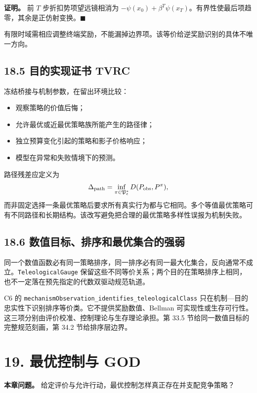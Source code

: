 \documentclass[
  11pt,
  oneside]{book}
\providecommand{\tightlist}{%
  \setlength{\itemsep}{0pt}\setlength{\parskip}{0pt}}
\begin{document}
\textbf{证明。} 前 \(T\) 步折扣势项望远镜相消为 \(-\psi(x_0)+\beta^T\psi(x_T)\)。有界性使最后项趋零，其余是正仿射变换。\(\blacksquare\)

有限时域需相应调整终端奖励，不能漏掉边界项。该等价给逆奖励识别的具体不唯一方向。

\section{18.5 目的实现证书 TVRC}\label{ux76eeux7684ux5b9eux73b0ux8bc1ux4e66-tvrc}

冻结桥接与机制参数，在留出环境比较：

\begin{itemize}
\tightlist
\item
  观察策略的价值后悔；
\item
  允许最优或近最优策略族所能产生的路径律；
\item
  独立预算变化引起的策略和影子价格响应；
\item
  模型在异常和失败情境下的预测。
\end{itemize}

路径残差应定义为 \[\Delta_{\rm path}=
\inf_{\pi\in\mathfrak P^*_\epsilon}
D(P_{\rm obs},P^\pi),\] 而非固定选择一条最优策略后要求所有真实行为都与它相同。多个等值最优策略可有不同路径和长期结构。该改写避免把合理的最优策略多样性误报为机制失败。

\section{18.6 数值目标、排序和最优集合的强弱}\label{ux6570ux503cux76eeux6807ux6392ux5e8fux548cux6700ux4f18ux96c6ux5408ux7684ux5f3aux5f31}

同一个数值函数必有同一策略排序，同一排序必有同一最大化集合，反向通常不成立。\nolinkurl{TeleologicalGauge} 保留这些不同等价关系；两个目的在策略排序上相同，也不一定落在预先指定的代数双驱动规范轨道。

C6 的 \nolinkurl{mechanismObservation_identifies_teleologicalClass} 只在机制---目的忠实性下识别排序等价类。它不提供奖励数值、Bellman 可实现性或生存可行性。这三项分别由评价校准、控制理论与生存理论承担。第 33.5 节给同一数值目标的完整规范刻画，第 34.2 节给排序层边界。

\chapter{19. 最优控制与 GOD}\label{ch-19}

\textbf{本章问题。} 给定评价与允许行动，最优控制怎样真正存在并支配竞争策略？
\end{document}
